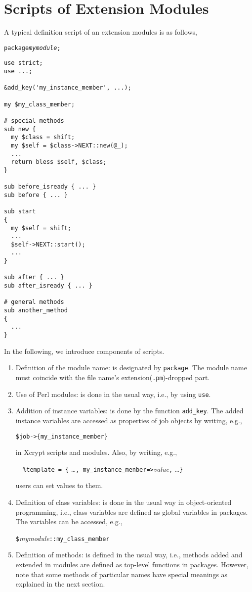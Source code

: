 \documentclass[a4paper,10pt]{report}
\def\|{\verb|} %|
\begin{document}
\section{Scripts of Extension Modules}

A typical definition script of an extension modules is as follows,
\begin{boxnote}
  \begin{alltt}
package {\it mymodule};
  \end{alltt}
\begin{verbatim}
use strict;
use ...;

&add_key('my_instance_member', ...);

my $my_class_member;

# special methods
sub new {
  my $class = shift;
  my $self = $class->NEXT::new(@_);
  ... 
  return bless $self, $class;
}

sub before_isready { ... }
sub before { ... }

sub start
{
  my $self = shift;
  ...
  $self->NEXT::start();
  ...
}

sub after { ... }
sub after_isready { ... }

# general methods
sub another_method
{
  ...
}
\end{verbatim}
\end{boxnote}
\vspace{\baselineskip}

In the following, we introduce components of scripts.
\begin{enumerate}
  \item Definition of the module name: is designated by \|package|.
	The module name must coincide with the file name's
	extension(\|.pm|)-dropped part.
  \item Use of Perl modules: is done in the usual way, i.e., by using
	\|use|.
  \item Addition of instance variables: is done by the function
	\|add_key|.  The added instance variables are accessed as
	properties of job objects by writing, e.g.,
	\begin{center}
	 \|$job->{my_instance_member}|
	\end{center}
	in Xcrypt scripts and modules.  Also, by writing, e.g.,
	\begin{center}
	 \|  |\|%
	\end{center}
	users can set values to them.
 \item Definition of class variables: is done in the usual way in
       object-oriented programming, i.e., class variables are defined
       as global variables in packages.  The variables can be
       accessed, e.g.,
	 \begin{center}
	  \|$|{\it mymodule}\|::my_class_member|
	 \end{center}
  \item Definition of methods: is defined in the usual way, i.e.,
	methods added and extended in modules are defined as top-level
	functions in packages.  However, note that some methods of
	particular names have special meanings as explained in the next
	section.
\end{enumerate}
\end{document}
